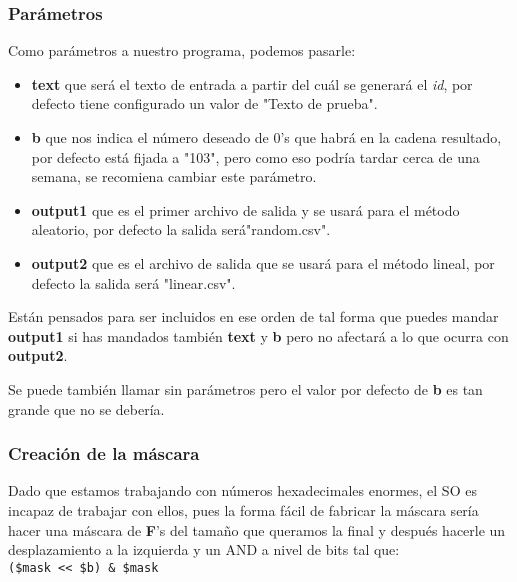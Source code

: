 \documentclass[a4paper, 11pt]{article}
\begin{document}
		\subsubsection{Parámetros}
			Como parámetros a nuestro programa, podemos pasarle:
			\begin{itemize}
				\item \textbf{text} que será el texto de entrada a partir del cuál se generará el \textit{id}, por defecto
				tiene configurado un valor de "Texto de prueba".

				\item \textbf{b} que nos indica el número deseado de 0's que habrá en la cadena resultado, por defecto está
				fijada a "103", pero como eso podría tardar cerca de una semana, se recomiena cambiar este parámetro.

				\item \textbf{output1} que es el primer archivo de salida y se usará para el método aleatorio, por defecto la 
				salida será"random.csv".
				
				\item \textbf{output2} que es el archivo de salida que se usará para el método lineal, por defecto la salida
				será "linear.csv".
			\end{itemize}
			
			Están pensados para ser incluidos en ese orden de tal forma que puedes mandar \textbf{output1} si has mandados
			también \textbf{text} y \textbf{b} pero no afectará a lo que ocurra con \textbf{output2}.
			
			Se puede también llamar sin parámetros pero el valor por defecto de \textbf{b} es tan grande que no se debería.
			
		\subsubsection{Creación de la máscara}
			Dado que estamos trabajando con números hexadecimales enormes, el SO es incapaz de trabajar con ellos, pues la
			forma fácil de fabricar la máscara sería hacer una máscara de \textbf{F}'s del tamaño que queramos la final y
			después hacerle un desplazamiento a la izquierda y un AND a nivel de bits tal que: \\
			\verb|($mask << $b) & $mask|
			
\end{document}
